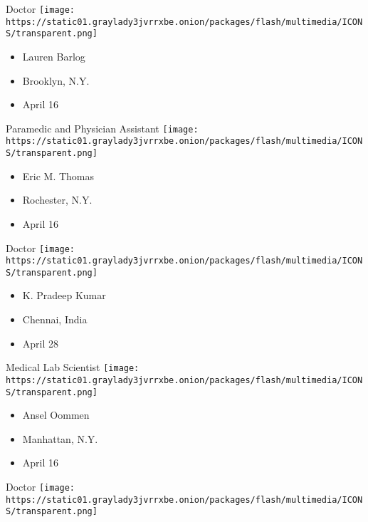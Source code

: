 \protect\hyperlink{item-lauren-barlog}{}

Doctor
\texttt{[image: https://static01.graylady3jvrrxbe.onion/packages/flash/multimedia/ICONS/transparent.png]}

\begin{itemize}
\tightlist
\item
  Lauren Barlog
\item
  Brooklyn, N.Y.
\item
  April 16
\end{itemize}

\protect\hyperlink{item-eric-m-thomas}{}

Paramedic and Physician Assistant
\texttt{[image: https://static01.graylady3jvrrxbe.onion/packages/flash/multimedia/ICONS/transparent.png]}

\begin{itemize}
\tightlist
\item
  Eric M. Thomas
\item
  Rochester, N.Y.
\item
  April 16
\end{itemize}

\protect\hyperlink{item-k-pradeep-kumar}{}

Doctor
\texttt{[image: https://static01.graylady3jvrrxbe.onion/packages/flash/multimedia/ICONS/transparent.png]}

\begin{itemize}
\tightlist
\item
  K. Pradeep Kumar
\item
  Chennai, India
\item
  April 28
\end{itemize}

\protect\hyperlink{item-ansel-oommen}{}

Medical Lab Scientist
\texttt{[image: https://static01.graylady3jvrrxbe.onion/packages/flash/multimedia/ICONS/transparent.png]}

\begin{itemize}
\tightlist
\item
  Ansel Oommen
\item
  Manhattan, N.Y.
\item
  April 16
\end{itemize}

\protect\hyperlink{item-letizia-rossi}{}

Doctor
\texttt{[image: https://static01.graylady3jvrrxbe.onion/packages/flash/multimedia/ICONS/transparent.png]}

